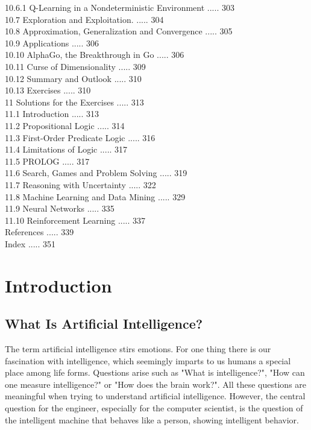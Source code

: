 \documentclass[10pt]{book}
\begin{document}
10.6.1 Q-Learning in a Nondeterministic Environment ..... 303\\
10.7 Exploration and Exploitation. ..... 304\\
10.8 Approximation, Generalization and Convergence ..... 305\\
10.9 Applications ..... 306\\
10.10 AlphaGo, the Breakthrough in Go ..... 306\\
10.11 Curse of Dimensionality ..... 309\\
10.12 Summary and Outlook ..... 310\\
10.13 Exercises ..... 310\\
11 Solutions for the Exercises ..... 313\\
11.1 Introduction ..... 313\\
11.2 Propositional Logic ..... 314\\
11.3 First-Order Predicate Logic ..... 316\\

11.4 Limitations of Logic ..... 317\\
11.5 PROLOG ..... 317\\
11.6 Search, Games and Problem Solving ..... 319\\
11.7 Reasoning with Uncertainty ..... 322\\
11.8 Machine Learning and Data Mining ..... 329\\
11.9 Neural Networks ..... 335\\
11.10 Reinforcement Learning ..... 337\\
References ..... 339\\
Index ..... 351

\chapter{Introduction}

\section{What Is Artificial Intelligence?}
The term artificial intelligence stirs emotions. For one thing there is our fascination with intelligence, which seemingly imparts to us humans a special place among life forms. Questions arise such as "What is intelligence?", "How can one measure intelligence?" or "How does the brain work?". All these questions are meaningful when trying to understand artificial intelligence. However, the central question for the engineer, especially for the computer scientist, is the question of the intelligent machine that behaves like a person, showing intelligent behavior.
\end{document}
